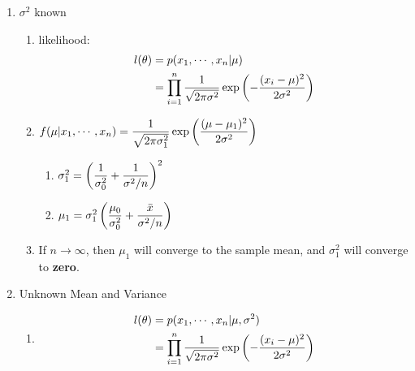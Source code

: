 \begin{enumerate}[itemsep=0.2cm]
    \item $\sigma^2$ known \cite{ism-1}
    \begin{enumerate}[itemsep=0.2cm]
        \item likelihood: 
        \begin{align*}
            l(\theta)
            &= p(x_1, \cdots, x_n|\mu) \\
            &= \displaystyle\prod_{i=1}^{n} 
                \dfrac{1}{\sqrt{2\pi\sigma^2}}
                \exp\left(
                    -\dfrac{(x_i - \mu)^2}{2\sigma^2}
                \right)
        \end{align*}

        \item $
            f(\mu|x_1, \cdots, x_n) 
            = \dfrac{1}{\sqrt{2\pi\sigma_1^2}}
                \exp\left(
                    \dfrac{(\mu - \mu_1)^2}{2\sigma^2}
                \right)
        $
        \begin{enumerate}[itemsep=0.2cm]
            \item $
                \sigma_1^2
                = \left(
                    \dfrac{1}{\sigma_0^2} +
                    \dfrac{1}{\sigma^2/n}
                \right)^2
            $

            \item $
                \mu_1
                = \sigma_1^2\left(
                    \dfrac{\mu_0}{\sigma_0^2} +
                    \dfrac{\bar{x}}{\sigma^2/n}
                \right)
            $
        \end{enumerate}

        \item If $n \to \infty$, then $\mu_1$ will converge to the sample mean, and $\sigma_1^2$ will converge to \textbf{zero}.
        
    \end{enumerate}

    \item Unknown Mean and Variance \cite{ism-1}
    \begin{enumerate}[itemsep=0.2cm]
        \item \begin{align*}
            l(\theta)
            &= p(x_1, \cdots, x_n|\mu, \sigma^2) \\
            &= \displaystyle\prod_{i=1}^{n} 
                \dfrac{1}{\sqrt{2\pi\sigma^2}}
                \exp\left(
                    -\dfrac{(x_i - \mu)^2}{2\sigma^2}
                \right)
        \end{align*}


\end{enumerate}
\end{enumerate}
